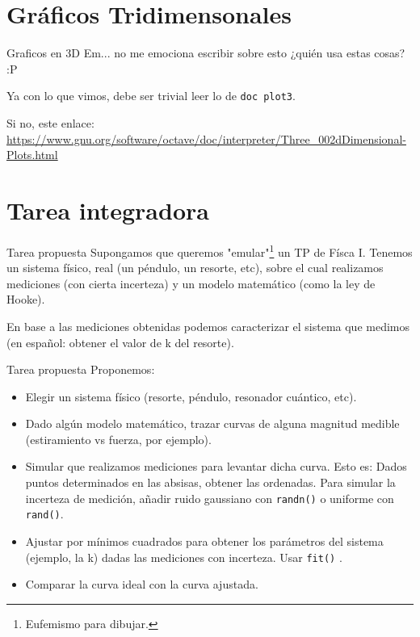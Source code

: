 \section{Gráficos Tridimensonales}
\begin{frame}[fragile]{Graficos en 3D}
Em... no me emociona escribir sobre esto ¿quién usa estas cosas? :P

Ya con lo que vimos, debe ser trivial leer lo de \verb$doc plot3$.

Si no, este enlace: \url{https://www.gnu.org/software/octave/doc/interpreter/Three_002dDimensional-Plots.html}
\end{frame}

\section{Tarea integradora}
\begin{frame}[fragile]{Tarea propuesta}
Supongamos que queremos "emular"\footnote{Eufemismo para dibujar.} un TP de Físca I. Tenemos un sistema físico, real (un péndulo, un resorte, etc), sobre el cual realizamos mediciones (con cierta incerteza) y un modelo matemático (como la ley de Hooke).

En base a las mediciones obtenidas podemos caracterizar el sistema que medimos (en español: obtener el valor de k del resorte).
\end{frame}

\begin{frame}[fragile]{Tarea propuesta}
Proponemos:

\begin{itemize}
\item Elegir un sistema físico (resorte, péndulo, resonador cuántico, etc).
\item Dado algún modelo matemático, trazar curvas de alguna magnitud medible (estiramiento vs fuerza, por ejemplo).
\item Simular que realizamos mediciones para levantar dicha curva. Esto es: Dados puntos determinados en las absisas, obtener las ordenadas. Para simular la incerteza de medición, añadir ruido gaussiano con \verb$randn()$ o uniforme con \verb$rand()$.
\item Ajustar por mínimos cuadrados para obtener los parámetros del sistema (ejemplo, la k) dadas las mediciones con incerteza. Usar \verb$fit()$ .
\item Comparar la curva ideal con la curva ajustada.
\end{itemize}
\end{frame}